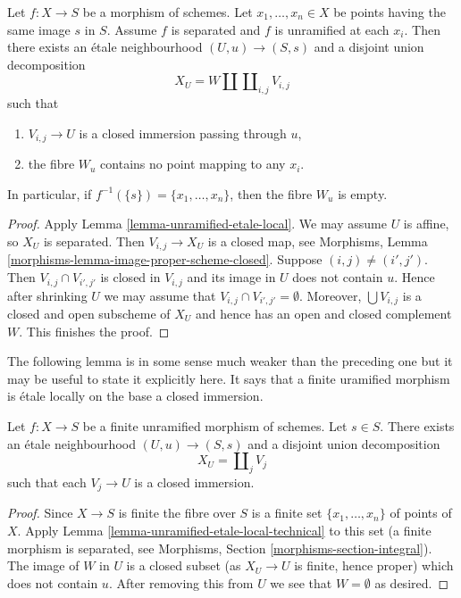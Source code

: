 \begin{lemma}
\label{lemma-unramified-etale-local-technical}
Let $f : X \to S$ be a morphism of schemes.
Let $x_1, \ldots, x_n \in X$ be points having the same image $s$ in $S$.
Assume $f$ is separated and $f$ is unramified at each $x_i$.
Then there exists an \'etale neighbourhood $(U, u) \to (S, s)$
and a disjoint union decomposition
$$
X_U =
W \amalg \coprod\nolimits_{i, j} V_{i, j}
$$
such that
\begin{enumerate}
\item $V_{i, j} \to U$ is a closed immersion passing through $u$,
\item the fibre $W_u$ contains no point mapping to any $x_i$.
\end{enumerate}
In particular, if $f^{-1}(\{s\}) = \{x_1, \ldots, x_n\}$, then
the fibre $W_u$ is empty.
\end{lemma}

\begin{proof}
Apply
Lemma \ref{lemma-unramified-etale-local}.
We may assume $U$ is affine, so $X_U$ is separated.
Then $V_{i, j} \to X_U$ is a closed map, see
Morphisms, Lemma \ref{morphisms-lemma-image-proper-scheme-closed}.
Suppose $(i, j) \not = (i', j')$.
Then $V_{i,j} \cap V_{i', j'}$ is closed in $V_{i, j}$ and
its image in $U$ does not contain $u$.
Hence after shrinking $U$ we may assume that
$V_{i, j} \cap V_{i', j'} = \emptyset$. Moreover, $\bigcup V_{i, j}$ is
a closed and open subscheme of $X_U$ and hence has an open and closed
complement $W$. This finishes the proof.
\end{proof}

\noindent
The following lemma is in some sense much weaker than the preceding one
but it may be useful to state it explicitly here. It says that a finite
uramified morphism is \'etale locally on the base a closed immersion.

\begin{lemma}
\label{lemma-finite-unramified-etale-local}
Let $f : X \to S$ be a finite unramified morphism of schemes.
Let $s \in S$.
There exists an \'etale neighbourhood $(U, u) \to (S, s)$
and a disjoint union decomposition
$$
X_U = \coprod\nolimits_j V_j
$$
such that each $V_j \to U$ is a closed immersion.
\end{lemma}

\begin{proof}
Since $X \to S$ is finite the fibre over $S$ is a finite set
$\{x_1, \ldots, x_n\}$ of points of $X$. Apply
Lemma \ref{lemma-unramified-etale-local-technical}
to this set (a finite morphism is separated, see
Morphisms, Section \ref{morphisms-section-integral}).
The image of $W$ in $U$ is a closed
subset (as $X_U \to U$ is finite, hence proper) which does not
contain $u$. After removing this from $U$ we see that $W = \emptyset$
as desired.
\end{proof}




